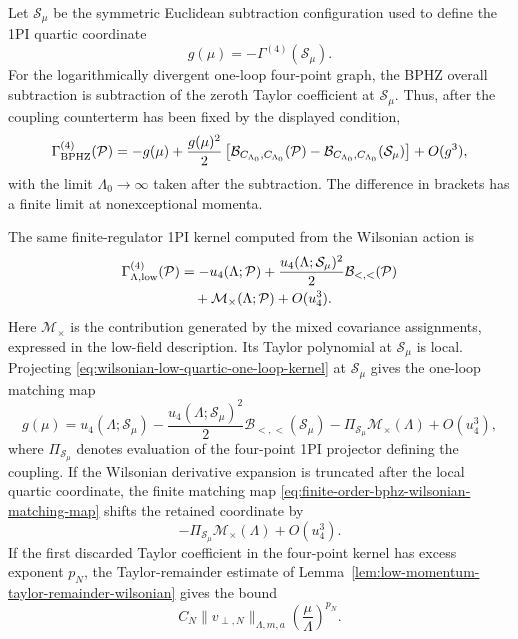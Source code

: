 Let \(\mathcal S_\mu\) be the symmetric Euclidean subtraction configuration
used to define the 1PI quartic coordinate
\[
  g(\mu)=-\Gamma^{(4)}(\mathcal S_\mu).
\]
For the logarithmically divergent one-loop four-point graph, the BPHZ overall
subtraction is subtraction of the zeroth Taylor coefficient at
\(\mathcal S_\mu\).  Thus, after the coupling counterterm has been fixed by
the displayed condition,
\begin{equation}
  \Gamma^{(4)}_{\rm BPHZ}(\mathcal P)
  =
  -g(\mu)
  +
  \frac{g(\mu)^2}{2}
  \left[
    \mathcal B_{C_{\Lambda_0},C_{\Lambda_0}}(\mathcal P)
    -
    \mathcal B_{C_{\Lambda_0},C_{\Lambda_0}}(\mathcal S_\mu)
  \right]
  +
  O(g^3),
  \label{eq:bphz-quartic-one-loop-subtracted}
\end{equation}
with the limit \(\Lambda_0\to\infty\) taken after the subtraction.  The
difference in brackets has a finite limit at nonexceptional momenta.

The same finite-regulator 1PI kernel computed from the Wilsonian action is
\begin{equation}
\begin{aligned}
  \Gamma^{(4)}_{\Lambda,{\rm low}}(\mathcal P)
  &=
  -u_4(\Lambda;\mathcal P)
  +
  \frac{u_4(\Lambda;\mathcal S_\mu)^2}{2}
  \mathcal B_{<,<}(\mathcal P)        \\
  &\quad
  +
  \mathcal M_\times(\Lambda;\mathcal P)
  +
  O(u_4^3).
\end{aligned}
  \label{eq:wilsonian-low-quartic-one-loop-kernel}
\end{equation}
Here \(\mathcal M_\times\) is the contribution generated by the mixed
covariance assignments, expressed in the low-field description.  Its Taylor
polynomial at \(\mathcal S_\mu\) is local.  Projecting
\eqref{eq:wilsonian-low-quartic-one-loop-kernel} at \(\mathcal S_\mu\) gives
the one-loop matching map
\begin{equation}
  g(\mu)
  =
  u_4(\Lambda;\mathcal S_\mu)
  -
  \frac{u_4(\Lambda;\mathcal S_\mu)^2}{2}
  \mathcal B_{<,<}(\mathcal S_\mu)
  -
  \Pi_{\mathcal S_\mu}\mathcal M_\times(\Lambda)
  +
  O(u_4^3),
  \label{eq:one-loop-quartic-wilsonian-to-one-pi-coordinate}
\end{equation}
where \(\Pi_{\mathcal S_\mu}\) denotes evaluation of the four-point 1PI
projector defining the coupling.  If the Wilsonian derivative expansion is
truncated after the local quartic coordinate, the finite matching map
\eqref{eq:finite-order-bphz-wilsonian-matching-map} shifts the retained
coordinate by
\[
  -\Pi_{\mathcal S_\mu}\mathcal M_\times(\Lambda)+O(u_4^3).
\]
If the first discarded Taylor coefficient in the four-point kernel has excess
exponent \(p_N\), the Taylor-remainder estimate of
Lemma~\ref{lem:low-momentum-taylor-remainder-wilsonian} gives the bound
\[
  C_N\|v_{\perp,N}\|_{\Lambda,m,a}
  \left(\frac{\mu}{\Lambda}\right)^{p_N}.
\]

